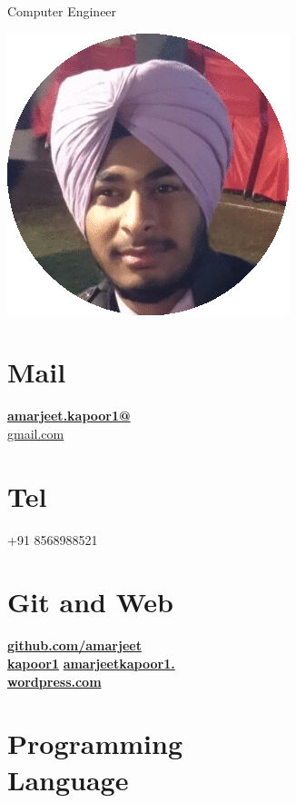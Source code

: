 \documentclass[]{friggeri-cv}
\begin{document}
      {Computer Engineer}
      

\begin{aside}
\includegraphics[scale=0.30]{amar.png}
      \section{Mail}
    \href{mailto:amarjeet.kapoor1@gmail.com}{\textbf{amarjeet.kapoor1@}\\gmail.com}
  \section{Tel}
    +91 8568988521
  \section{Git and Web}
    \href{http://github.com/amarjeetkapoor1}{\textbf{github.com/amarjeet \\ kapoor1}}
    \href{http://amarjeetkapoor1.wordpress.com}{\textbf{amarjeetkapoor1.\\wordpress.com}}
  \section{Programming \\ Language}
    

\end{aside}
\end{document}
